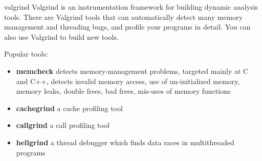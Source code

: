 \begin{frame}{valgrind}
\justifying Valgrind is an instrumentation framework for building dynamic analysis tools.
There are Valgrind tools that can automatically detect many memory management and threading bugs,
and profile your programs in detail. You can also use Valgrind to build new tools. \newline

Popular tools:
    \begin{itemize}
        \item \textbf{memcheck} detects memory-management problems, targeted mainly at C and C++, detects invalid memory access, use of un-initialized memory, memory leaks, double frees, bad frees, mis-uses of memory functions
        \item \textbf{cachegrind} a cache profiling tool
        \item \textbf{callgrind} a call profiling tool
        \item \textbf{hellgrind} a thread debugger which finds data races in multithreaded programs
    \end{itemize}

\end{frame}


